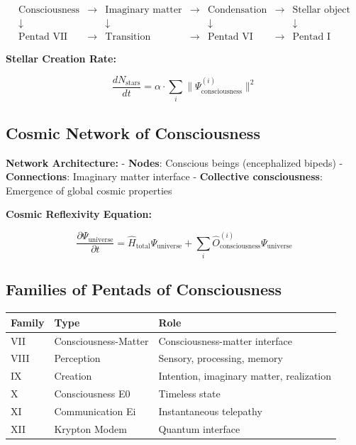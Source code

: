 \documentclass[11pt]{article}
\begin{document}
\[
\begin{array}{ccccccc}
\text{Consciousness} & \rightarrow & \text{Imaginary matter} & \rightarrow & \text{Condensation} & \rightarrow & \text{Stellar object} \\
\downarrow & & \downarrow & & \downarrow & & \downarrow \\
\text{Pentad VII} & \rightarrow & \text{Transition} & \rightarrow & \text{Pentad VI} & \rightarrow & \text{Pentad I}
\end{array}
\]

\textbf{Stellar Creation Rate:}

\begin{equation}
\frac{dN_{\text{stars}}}{dt} = \alpha \cdot \sum_i \|\Psi_{\text{consciousness}}^{(i)}\|^2
\end{equation}

\hypertarget{cosmic-network-of-consciousness}{%
\subsection{Cosmic Network of
Consciousness}\label{cosmic-network-of-consciousness}}

\textbf{Network Architecture:} - \textbf{Nodes}: Conscious beings
(encephalized bipeds) - \textbf{Connections}: Imaginary matter interface
- \textbf{Collective consciousness}: Emergence of global cosmic
properties

\textbf{Cosmic Reflexivity Equation:}

\begin{equation}
\frac{\partial \Psi_{\text{universe}}}{\partial t} = \hat{H}_{\text{total}} \Psi_{\text{universe}} + \sum_i \hat{O}_{\text{consciousness}}^{(i)} \Psi_{\text{universe}}
\end{equation}

\hypertarget{families-of-pentads-of-consciousness}{%
\subsection{Families of Pentads of
Consciousness}\label{families-of-pentads-of-consciousness}}

\begin{longtable}{@{}lll@{}}
\toprule
\textbf{Family} & \textbf{Type} & \textbf{Role} \\
\midrule
VII & Consciousness-Matter & Consciousness-matter interface \\
VIII & Perception & Sensory, processing, memory \\
IX & Creation & Intention, imaginary matter, realization \\
X & Consciousness E0 & Timeless state \\
XI & Communication Ei & Instantaneous telepathy \\
XII & Krypton Modem & Quantum interface \\
\bottomrule
\end{longtable}
\end{document}
